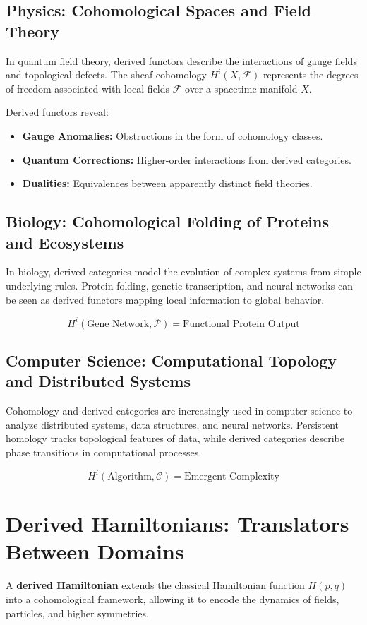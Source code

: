 \documentclass{article}
\begin{document}
\subsection{Physics: Cohomological Spaces and Field Theory}
In quantum field theory, derived functors describe the interactions of gauge fields and topological defects. The sheaf cohomology \( H^i(X, \mathcal{F}) \) represents the degrees of freedom associated with local fields \( \mathcal{F} \) over a spacetime manifold \( X \).

Derived functors reveal:
\begin{itemize}
    \item \textbf{Gauge Anomalies:} Obstructions in the form of cohomology classes.
    \item \textbf{Quantum Corrections:} Higher-order interactions from derived categories.
    \item \textbf{Dualities:} Equivalences between apparently distinct field theories.
\end{itemize}

\subsection{Biology: Cohomological Folding of Proteins and Ecosystems}
In biology, derived categories model the evolution of complex systems from simple underlying rules. Protein folding, genetic transcription, and neural networks can be seen as derived functors mapping local information to global behavior.

\[
H^i(\text{Gene Network}, \mathcal{P}) = \text{Functional Protein Output}
\]

\subsection{Computer Science: Computational Topology and Distributed Systems}
Cohomology and derived categories are increasingly used in computer science to analyze distributed systems, data structures, and neural networks. Persistent homology tracks topological features of data, while derived categories describe phase transitions in computational processes.

\[
H^i(\text{Algorithm}, \mathcal{C}) = \text{Emergent Complexity}
\]

\section{Derived Hamiltonians: Translators Between Domains}
A \textbf{derived Hamiltonian} extends the classical Hamiltonian function \( H(p,q) \) into a cohomological framework, allowing it to encode the dynamics of fields, particles, and higher symmetries.
\end{document}
